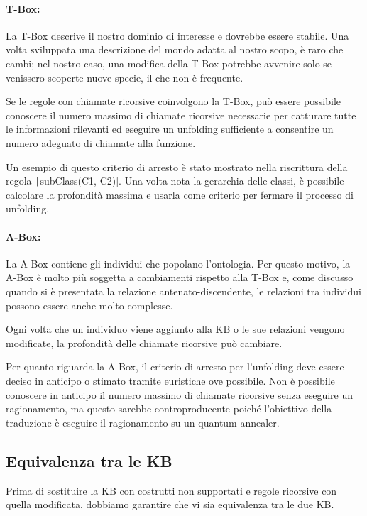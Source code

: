 \paragraph{T-Box:} La T-Box descrive il nostro dominio di interesse e dovrebbe essere stabile. Una volta sviluppata una descrizione del mondo adatta al nostro scopo, è raro che cambi; nel nostro caso, una modifica della T-Box potrebbe avvenire solo se venissero scoperte nuove specie, il che non è frequente.

Se le regole con chiamate ricorsive coinvolgono la T-Box, può essere possibile conoscere il numero massimo di chiamate ricorsive necessarie per catturare tutte le informazioni rilevanti ed eseguire un unfolding sufficiente a consentire un numero adeguato di chiamate alla funzione.

Un esempio di questo criterio di arresto è stato mostrato nella riscrittura della regola \texttt|subClass(C1, C2)|. Una volta nota la gerarchia delle classi, è possibile calcolare la profondità massima e usarla come criterio per fermare il processo di unfolding.

\paragraph{A-Box:} La A-Box contiene gli individui che popolano l'ontologia. Per questo motivo, la A-Box è molto più soggetta a cambiamenti rispetto alla T-Box e, come discusso quando si è presentata la relazione antenato-discendente, le relazioni tra individui possono essere anche molto complesse.

Ogni volta che un individuo viene aggiunto alla KB o le sue relazioni vengono modificate, la profondità delle chiamate ricorsive può cambiare.

Per quanto riguarda la A-Box, il criterio di arresto per l'unfolding deve essere deciso in anticipo o stimato tramite euristiche ove possibile. Non è possibile conoscere in anticipo il numero massimo di chiamate ricorsive senza eseguire un ragionamento, ma questo sarebbe controproducente poiché l'obiettivo della traduzione è eseguire il ragionamento su un quantum annealer.

\subsection{Equivalenza tra le KB}
Prima di sostituire la KB con costrutti non supportati e regole ricorsive con quella modificata, dobbiamo garantire che vi sia equivalenza tra le due KB. 

